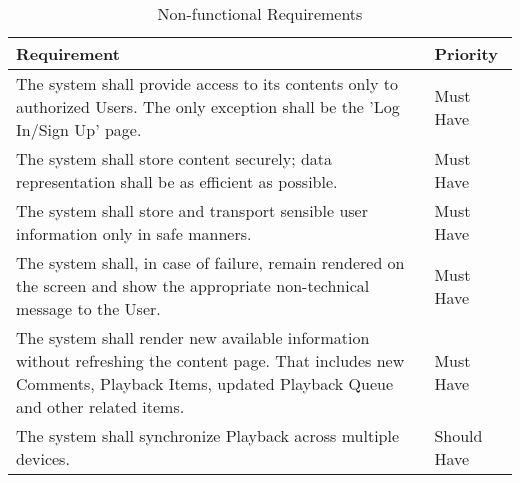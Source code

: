 \begin{table}[h!]
    \centering
    \begin{tabular}{|p{12cm}|p{3cm}|}
        \hline
        \textbf{Requirement}                                                                                                                                                               & \textbf{Priority} \\
        \hline
        The system shall provide access to its contents only to authorized Users. The only exception shall be the 'Log In/Sign Up' page. & Must Have \\
        \hline
        The system shall store content securely; data representation shall be as efficient as possible. & Must Have \\
        \hline
        The system shall store and transport sensible user information only in safe manners. & Must Have \\
        \hline
        The system shall, in case of failure, remain rendered on the screen and show the appropriate non-technical message to the User. & Must Have \\
        \hline
        The system shall render new available information without refreshing the content page. That includes new Comments, Playback Items, updated Playback Queue and other related items. & Must Have \\
        \hline
        The system shall synchronize Playback across multiple devices.                                                                                                                     & Should Have       \\
        \hline
    \end{tabular}
    \caption{Non-functional Requirements}
\end{table}

